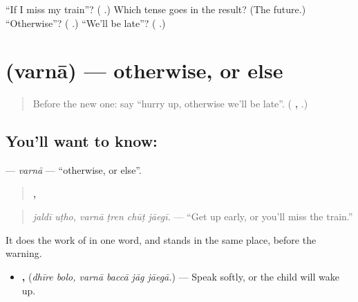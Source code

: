 \begin{tcolorbox}[breakable,colback=teal!4,colframe=teal!35!black,title={Before you move on}]
\textquotedblleft{}If I miss my train\textquotedblright{}? (\textbf{    }.) Which tense goes in the result? (The future.) \textquotedblleft{}Otherwise\textquotedblright{}? (\textbf{ }.) \textquotedblleft{}We'll be late\textquotedblright{}? (\textbf{  }.)
\end{tcolorbox}
\section[\texorpdfstring{\hi{वरना} (varnā)}{वरना (varnā)}]{ (varnā) — otherwise, or else}

\label{lesson:HI-C286-varna}



\begin{quote}
Before the new one: say \textquotedblleft{}hurry up, otherwise we'll be late\textquotedblright{}. (\textbf{ ,     }.)
\end{quote}

\subsection*{You'll want to know: }
\textbf{} — \emph{varnā} — \textquotedblleft{}otherwise, or else\textquotedblright{}.

\begin{quote}
\textbf{ ,    }
\end{quote}

\begin{quote}
\emph{jaldī uṭho, varnā ṭren chūṭ jāegī.} — \textquotedblleft{}Get up early, or you'll miss the train.\textquotedblright{}
\end{quote}

It does the work of \textbf{ } in one word, and stands in the same place, before the warning.

\begin{itemize}
\raggedright
  \item \textbf{ ,    } (\emph{dhīre bolo, varnā baccā jāg jāegā.}) — Speak softly, or the child will wake up.
\end{itemize}

